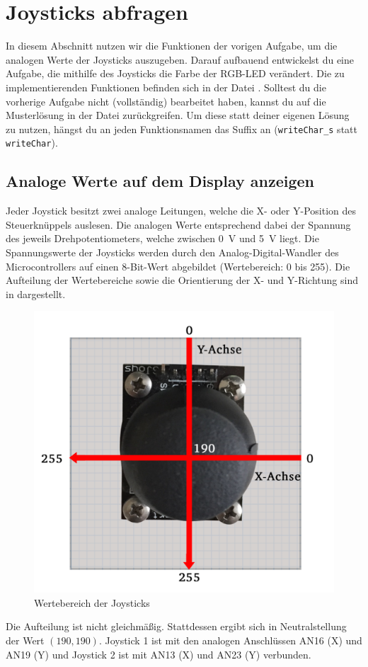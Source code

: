 \section{\ExercisePrefixEmbeddedC Joysticks abfragen \optional}
In diesem Abschnitt nutzen wir die Funktionen der vorigen Aufgabe, um die analogen Werte der Joysticks auszugeben. Darauf aufbauend entwickelst du eine Aufgabe, die mithilfe des Joysticks die Farbe der RGB-LED verändert.
Die zu implementierenden Funktionen befinden sich in der Datei .
Solltest du die vorherige Aufgabe nicht (vollständig) bearbeitet haben, kannst du auf die Musterlösung in der Datei  zurückgreifen.
Um diese statt deiner eigenen Lösung zu nutzen, hängst du an jeden Funktionsnamen das Suffix  an (\bspw \lstinline|writeChar_s| statt \lstinline|writeChar|).

\subsection{Analoge Werte auf dem Display anzeigen}

Jeder Joystick besitzt zwei analoge Leitungen, welche die X- oder Y-Position des Steuerknüppels auslesen.
Die analogen Werte entsprechend dabei der Spannung des jeweils Drehpotentiometers, welche zwischen \SI{0}{\volt} und \SI{5}{\volt} liegt.
Die Spannungswerte der Joysticks werden durch den Analog-Digital-Wandler des Microcontrollers auf einen 8-Bit-Wert abgebildet (Wertebereich: 0 bis 255).
Die Aufteilung der Wertebereiche sowie die Orientierung der X- und Y-Richtung sind in  dargestellt.
%
\begin{figure}
    \begin{centering}
        \includegraphics[width=.4\textwidth]{./05_c/figures/joystickValues.png}
        \caption{Wertebereich der Joysticks}
        \label{fig:jostickValues}
    \end{centering}
\end{figure}
%
Die Aufteilung ist nicht gleichmäßig.
Stattdessen ergibt sich in Neutralstellung der Wert $(190,190)$.
Joystick 1 ist mit den analogen Anschlüssen AN16 (X) und AN19 (Y) und Joystick 2 ist mit AN13 (X) und AN23 (Y) verbunden. 

